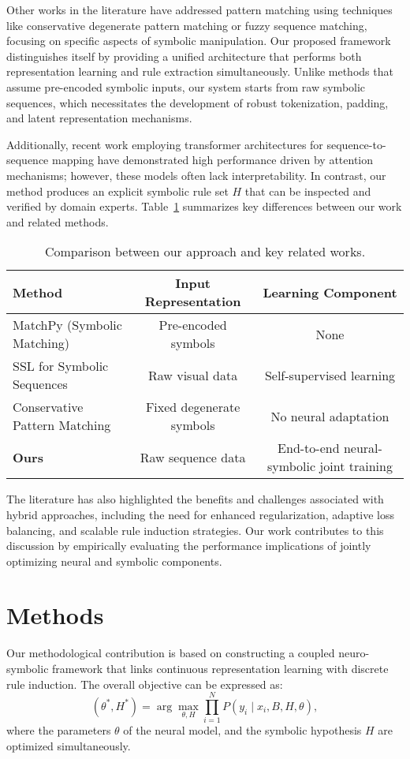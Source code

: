 \documentclass{article}
\begin{document}
Other works in the literature have addressed pattern matching using techniques like conservative degenerate pattern matching or fuzzy sequence matching, focusing on specific aspects of symbolic manipulation. Our proposed framework distinguishes itself by providing a unified architecture that performs both representation learning and rule extraction simultaneously. Unlike methods that assume pre-encoded symbolic inputs, our system starts from raw symbolic sequences, which necessitates the development of robust tokenization, padding, and latent representation mechanisms.

Additionally, recent work employing transformer architectures for sequence-to-sequence mapping have demonstrated high performance driven by attention mechanisms; however, these models often lack interpretability. In contrast, our method produces an explicit symbolic rule set \(H\) that can be inspected and verified by domain experts. Table~\ref{tab:related} summarizes key differences between our work and related methods.

\begin{table}[h]
\centering
\caption{Comparison between our approach and key related works.}
\begin{tabular}{lcc}
\hline
\textbf{Method} & \textbf{Input Representation} & \textbf{Learning Component} \\
\hline
MatchPy (Symbolic Matching) & Pre-encoded symbols & None \\
SSL for Symbolic Sequences & Raw visual data & Self-supervised learning \\
Conservative Pattern Matching & Fixed degenerate symbols & No neural adaptation \\
\textbf{Ours} & Raw sequence data & End-to-end neural-symbolic joint training \\
\hline
\end{tabular}
\label{tab:related}
\end{table}

The literature has also highlighted the benefits and challenges associated with hybrid approaches, including the need for enhanced regularization, adaptive loss balancing, and scalable rule induction strategies. Our work contributes to this discussion by empirically evaluating the performance implications of jointly optimizing neural and symbolic components.

\section{Methods}
Our methodological contribution is based on constructing a coupled neuro-symbolic framework that links continuous representation learning with discrete rule induction. The overall objective can be expressed as:
\[
(\theta^*, H^*) = \arg \max_{\theta, H} \prod_{i=1}^{N} P(y_i \mid x_i, B, H, \theta),
\]
where the parameters \(\theta\) of the neural model, and the symbolic hypothesis \(H\) are optimized simultaneously. 
\end{document}
